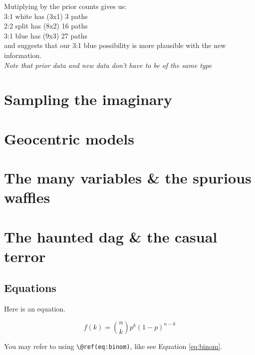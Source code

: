 \documentclass[
]{book}
\theoremstyle{definition}
\theoremstyle{definition}
\theoremstyle{definition}
\theoremstyle{definition}
\theoremstyle{remark}
\begin{document}
Mutiplying by the prior counts gives us:\\

3:1 white has (3x1) 3 paths\\
2:2 split has (8x2) 16 paths\\
3:1 blue has (9x3) 27 paths\\

and suggests that our 3:1 blue possibility is more plausible with the new information.\\
\emph{Note that prior data and new data don't have to be of the same type}

\hypertarget{sampling-the-imaginary}{%
\chapter{Sampling the imaginary}\label{sampling-the-imaginary}}

\hypertarget{geocentric-models}{%
\chapter{Geocentric models}\label{geocentric-models}}

\hypertarget{the-many-variables-the-spurious-waffles}{%
\chapter{The many variables \& the spurious waffles}\label{the-many-variables-the-spurious-waffles}}

\hypertarget{the-haunted-dag-the-casual-terror}{%
\chapter{The haunted dag \& the casual terror}\label{the-haunted-dag-the-casual-terror}}

\hypertarget{equations}{%
\section{Equations}\label{equations}}

Here is an equation.

\begin{equation} 
  f\left(k\right) = \binom{n}{k} p^k\left(1-p\right)^{n-k}
  \label{eq:binom}
\end{equation}

You may refer to using \texttt{\textbackslash{}@ref(eq:binom)}, like see Equation \eqref{eq:binom}.
\end{document}
